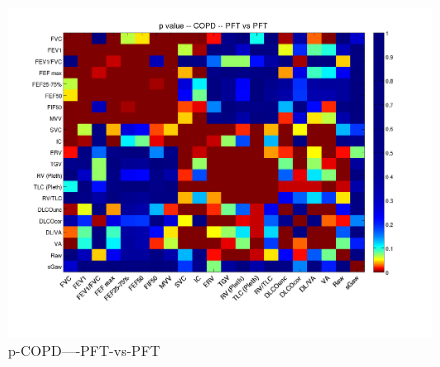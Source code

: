 \documentclass[12pt]{article}
\begin{document}
\begin{figure}
    \includegraphics[width=0.84\linewidth,viewport=100 60 620 550]{corr/p-COPD----PFT-vs-PFT.png}
    \caption{p-COPD----PFT-vs-PFT}
    \label{fig:p-COPD----PFT-vs-PFT}
\end{figure}
\end{document}

